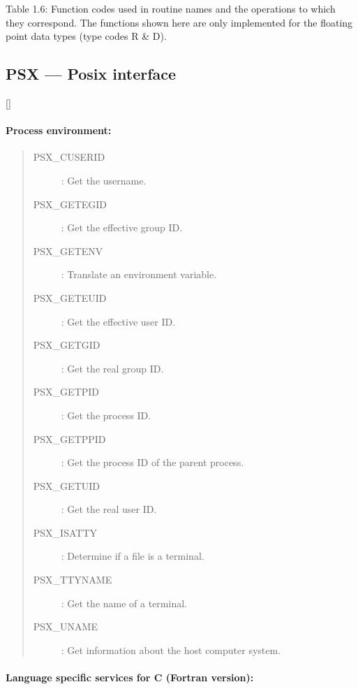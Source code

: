 Table 1.6: Function codes used in routine names and the operations to which they
correspond.
The functions shown here are only implemented for the floating point data types
(type codes R \& D).

\newpage

\subsection{PSX --- Posix interface}

\vspace{-9mm}

\hfill []

\vspace{2mm}

\paragraph{Process environment:} \hfill

\begin{quote}
\begin{description}
\item [PSX\_CUSERID] : Get the username.
\item [PSX\_GETEGID] : Get the effective group ID.
\item [PSX\_GETENV] : Translate an environment variable.
\item [PSX\_GETEUID] : Get the effective user ID.
\item [PSX\_GETGID] : Get the real group ID.
\item [PSX\_GETPID] : Get the process ID.
\item [PSX\_GETPPID] : Get the process ID of the parent process.
\item [PSX\_GETUID] : Get the real user ID.
\item [PSX\_ISATTY] : Determine if a file is a terminal.
\item [PSX\_TTYNAME] : Get the name of a terminal.
\item [PSX\_UNAME] : Get information about the host computer system.
\end{description}
\end{quote}

\vspace{10mm}

\paragraph{Language specific services for C (Fortran version):}

